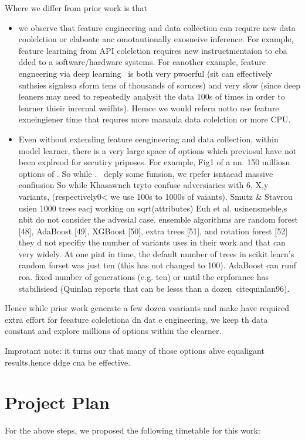 \documentclass{NSF}
\newenvironment{myitemize}
{ \begin{itemize}[topsep=0pt,bottomsep=0pt,itemsep=0,leftmargin=*]
    \setlength{\itemsep}{0pt}
    \setlength{\parskip}{0pt}
    \setlength{\parsep}{0pt}     }
{ \end{itemize}                  }
\newcommand{\bi}{\begin{myitemize}}
\newcommand{\ei}{\end{myitemize}}
\begin{document}
\begin{nsfdescription}
 
  Where we differ from prior work is that 
  \bi
  \item we observe that   feature engineering and data collection can require new data coolelction or elaboate anc omotautionally exosneive inference. For example, feature learining from API colelction requires new instructmentaion to eba dded to a software/hardware systems. For eanother example,  feature engneering via deep learning~\cite{dai19} is both very pwoerful (sit can effectively snthsies signlesa sform tens of thousands of soruces) and very slow (since deep leaners may need to repeatedly analysit the data 100s of times in order to learner thieir inrernal weifhts). Hemce we would refern notto use feature exneingiener  time that requres more manaula data colelction or more CPU.
  \item Even without extending feature eengineering and data collection, within model learner, there is a very large space of options which previosul have not been explreod for secutiry priposes. For example, Fig1 of a nn. 150 milliosn options
  of .  So while .~\cite{khasawneh2017rhmd} deply some funsion, we rpefer isntaead massive confiusion
  So while 
  Khasawneh tryto confuse adversiaries with 6, X,y variants, (respectively0< we use 100s to 1000s of vaiants). 
    Smutz \& Stavrou usien 1000 trees eacj working on sqrt(attributes)
  Euh et al. usinensmeble,s nbit do not consider the advesial case. 
  ensemble algorithms are random forest [48], AdaBoost [49], XGBoost [50], extra trees [51], and rotation forest [52]
  they d not specifiy the number of variants uses in their work and that can very widely. At one pint in time,
  the default number of trees in scikit learn's random forset was just ten (this has not changed to 100). AdaBoost can runf roa. fixed number of generations (e.g. ten) or until the erpforance has stabilisiesd (Quinlan reports that can be lesss than a dozen~cite{quinlan96}).
  
  \ei
  Hence while prior work generate a few dozen vsariants  and make have required extra effort for feeature colelctiona dn dat e engineering, we keep th  data constant and explore millions of options within the elearner.
  
  Improtant note: it turns our that many of those options ahve equaligant results.hence ddge cna be effective.
  
 
\section{Project Plan}
For the above steps, we proposed the following timetable for this work:


\end{nsfdescription}
\end{document}
